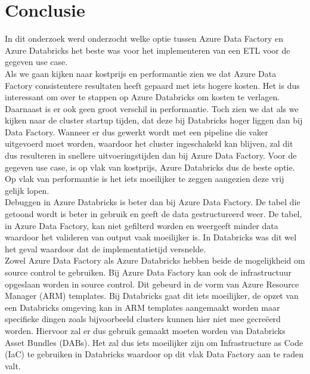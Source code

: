 
\chapter{Conclusie}%
\label{ch:conclusie}


In dit onderzoek werd onderzocht welke optie tussen Azure Data Factory en Azure Databricks het beste was voor het implementeren van een ETL voor de gegeven use case.\\

Als we gaan kijken naar kostprijs en performantie zien we dat Azure Data Factory consistentere resultaten heeft gepaard met iets hogere kosten. Het is dus interessant om over te stappen op Azure Databricks om kosten te verlagen. Daarnaast is er ook geen groot verschil in performantie. Toch zien we dat als we kijken naar de cluster startup tijden, dat deze bij Databricks hoger liggen dan bij Data Factory. Wanneer er dus gewerkt wordt met een pipeline die vaker uitgevoerd moet worden, waardoor het cluster ingeschakeld kan blijven, zal dit dus resulteren in snellere uitvoeringstijden dan bij Azure Data Factory. Voor de gegeven use case, is op vlak van kostprijs, Azure Databricks dus de beste optie. Op vlak van performantie is het iets moeilijker te zeggen aangezien deze vrij gelijk lopen.\\

Debuggen in Azure Databricks is beter dan bij Azure Data Factory. De tabel die getoond wordt is beter in gebruik en geeft de data gestructureerd weer. De tabel, in Azure Data Factory, kan niet gefilterd worden en weergeeft minder data waardoor het valideren van output vaak moeilijker is. In Databricks was dit wel het geval waardoor dat de implementatietijd versnelde.\\

Zowel Azure Data Factory als Azure Databricks hebben beide de mogelijkheid om source control te gebruiken. Bij Azure Data Factory kan ook de infrastructuur opgeslaan worden in source control. Dit gebeurd in de vorm van Azure Resource Manager (ARM) templates. Bij Databricks gaat dit iets moeilijker, de opzet van een Databricks omgeving kan in ARM templates aangemaakt worden maar specifieke dingen zoals bijvoorbeeld clusters kunnen hier niet mee gecreëerd worden. Hiervoor zal er dus gebruik gemaakt moeten worden van Databricks Asset Bundles (DABs). Het zal dus iets moeilijker zijn om Infrastructure as Code (IaC) te gebruiken in Databricks waardoor op dit vlak Data Factory aan te raden valt.\\

